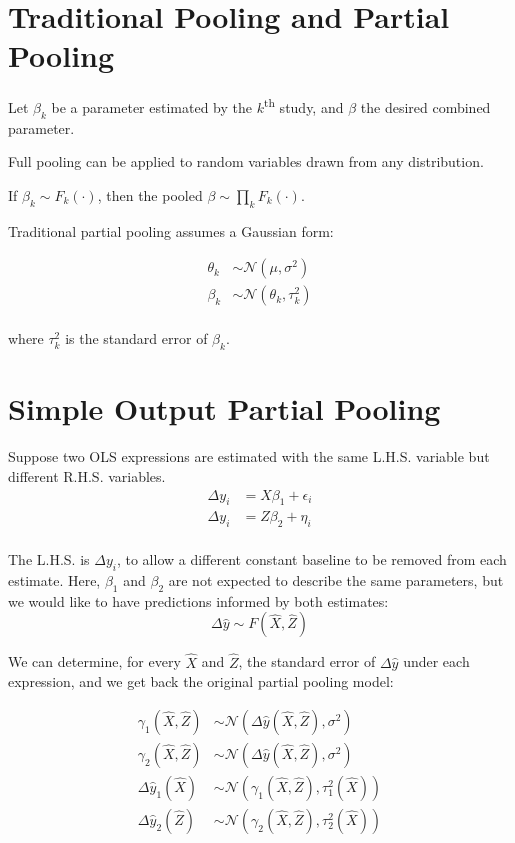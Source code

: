 \documentclass[]{article}
\begin{document}
\section{Traditional Pooling and Partial Pooling}

Let $\beta_k$ be a parameter estimated by the $k$\textsuperscript{th} study, and $\beta$ the desired combined parameter.

Full pooling can be applied to random variables drawn from any distribution.

If $\beta_k \sim F_k(\cdot)$, then the pooled $\beta \sim \prod_k F_k(\cdot)$.

Traditional partial pooling assumes a Gaussian form:

\begin{align*}
\theta_k &\sim \mathcal{N}(\mu, \sigma^2) \\
\beta_k &\sim \mathcal{N}(\theta_k, \tau_k^2) \\
\end{align*}

where $\tau_k^2$ is the standard error of $\beta_k$.

\section{Simple Output Partial Pooling}

Suppose two OLS expressions are estimated with the same L.H.S. variable but different R.H.S. variables.
\begin{align*}
\Delta y_i &= X \beta_1 + \epsilon_i \\
\Delta y_i &= Z \beta_2 + \eta_i \\
\end{align*}

The L.H.S. is $\Delta y_i$, to allow a different constant baseline to be removed from each estimate.  Here, $\beta_1$ and $\beta_2$ are not expected to describe the same parameters, but we would like to have predictions informed by both estimates:
\[
\Delta \hat{y} \sim F(\hat{X}, \hat{Z})
\]

We can determine, for every $\hat{X}$ and $\hat{Z}$, the standard error of $\Delta \hat{y}$ under each expression, and we get back the original partial pooling model:

\begin{align*}
\gamma_1(\hat{X}, \hat{Z}) &\sim \mathcal{N}(\Delta \hat{y}(\hat{X}, \hat{Z}), \sigma^2) \\
\gamma_2(\hat{X}, \hat{Z}) &\sim \mathcal{N}(\Delta \hat{y}(\hat{X}, \hat{Z}), \sigma^2) \\
\Delta \hat{y}_1(\hat{X}) &\sim \mathcal{N}(\gamma_1(\hat{X}, \hat{Z}), \tau_1^2(\hat{X})) \\
\Delta \hat{y}_2(\hat{Z}) &\sim \mathcal{N}(\gamma_2(\hat{X}, \hat{Z}), \tau_2^2(\hat{X})) \\
\end{align*}
\end{document}
